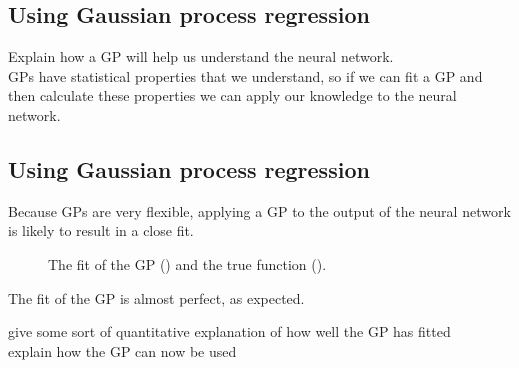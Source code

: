 \subsection{Using Gaussian process regression}
\begin{todo}
	Explain how a GP will help us understand the neural network. \\
	GPs have statistical properties that we understand, so if we can fit a GP and then calculate these properties we can apply our knowledge to the neural network.
\end{todo}

\subsection{Using Gaussian process regression}

Because \acp{GP} are very flexible, applying a \ac{GP} to the output of the neural network is likely to result in a close fit.

\begin{figure}[htbp]
	\centering
	
	\caption{The fit of the \ac{GP} (\gpcolour) and the true function (\truthcolour).}
	\label{fig:gp-fit}
\end{figure}

The fit of the \ac{GP} is almost perfect, as expected.

\begin{todo}
	give some sort of quantitative explanation of how well the GP has fitted \\
	explain how the GP can now be used
\end{todo}

